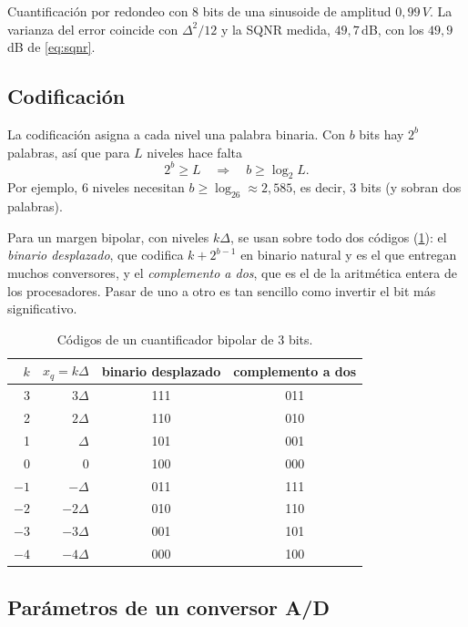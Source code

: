 \documentclass[11pt,a4paper]{scrartcl}
\begin{document}
\begin{encodigo}
  Cuantificación por redondeo con 8 bits de una sinusoide de amplitud $0{,}99\,V$. La varianza del error coincide con $\Delta^2/12$ y la SQNR medida, $49{,}7$\,dB, con los $49{,}9$\,dB de \eqref{eq:sqnr}.
\end{encodigo}

\subsection{Codificación}

La codificación asigna a cada nivel una palabra binaria. Con $b$ bits hay $2^b$ palabras, así que para $L$ niveles hace falta
\[
  2^b\ge L\quad\Longrightarrow\quad b\ge\log_2L.
\]
Por ejemplo, 6 niveles necesitan $b\ge\log_26\approx2{,}585$, es decir, 3 bits (y sobran dos palabras).

Para un margen bipolar, con niveles $k\Delta$, se usan sobre todo dos códigos (\cref{tab:codigos}): el \emph{binario desplazado}, que codifica $k+2^{b-1}$ en binario natural y es el que entregan muchos conversores, y el \emph{complemento a dos}, que es el de la aritmética entera de los procesadores. Pasar de uno a otro es tan sencillo como invertir el bit más significativo.

\begin{table}[ht]
  \centering
  \begin{tabular}{@{}rrcc@{}}
    \toprule
    $k$ & $x_q=k\Delta$ & binario desplazado & complemento a dos\\\midrule
    3 & $3\Delta$ & 111 & 011\\
    2 & $2\Delta$ & 110 & 010\\
    1 & $\Delta$ & 101 & 001\\
    0 & 0 & 100 & 000\\
    $-1$ & $-\Delta$ & 011 & 111\\
    $-2$ & $-2\Delta$ & 010 & 110\\
    $-3$ & $-3\Delta$ & 001 & 101\\
    $-4$ & $-4\Delta$ & 000 & 100\\\bottomrule
  \end{tabular}
  \caption{Códigos de un cuantificador bipolar de 3 bits.}
  \label{tab:codigos}
\end{table}

\subsection{Parámetros de un conversor A/D}
\end{document}
